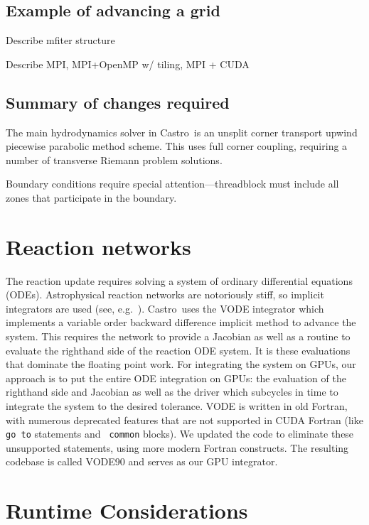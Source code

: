 \documentclass[twocolumn,times]{aastex62}
\newcommand{\castro}{{\sf Castro}}
\newcommand{\MarginPar}[1]{\marginpar{\vskip-\baselineskip\raggedright\tiny\sffamily\hrule\smallskip{\color{red}#1}\par\smallskip\hrule}}
\begin{document}
\subsection{Example of advancing a grid}

Describe mfiter structure

Describe MPI, MPI+OpenMP w/ tiling, MPI + CUDA


\subsection{Summary of changes required}

The main hydrodynamics solver in \castro\ is an unsplit corner
transport upwind \citep{ppmunsplit} piecewise parabolic method
\citep{ppm} scheme.  This uses full corner coupling, requiring a
number of transverse Riemann problem solutions.


Boundary conditions require special attention---threadblock must include
all zones that participate in the boundary.

\section{Reaction networks}

The reaction update requires solving a system of ordinary differential
equations (ODEs).  Astrophysical reaction networks are notoriously
stiff, so implicit integrators are used (see,
e.g.\ \citealt{timmes:1999}).  \castro\ uses the VODE integrator
\citep{vode} which implements a variable order backward difference
implicit method to advance the system.  This requires the network to
provide a Jacobian as well as a routine to evaluate the righthand side
of the reaction ODE system.  It is these evaluations that dominate the
floating point work.  For integrating the system on GPUs, our approach
is to put the entire ODE integration on GPUs: the evaluation of the
righthand side and Jacobian as well as the driver which subcycles in
time to integrate the system to the desired tolerance.  VODE is
written in old Fortran, with numerous deprecated features that are not
supported in CUDA Fortran (like {\tt go to} statements and {\tt
  common} blocks).  We updated the code to eliminate these unsupported
statements, using more modern Fortran constructs.  The resulting
codebase is called VODE90 and serves as our GPU integrator.  \MarginPar{more here from Don}


\section{Runtime Considerations}
\end{document}
